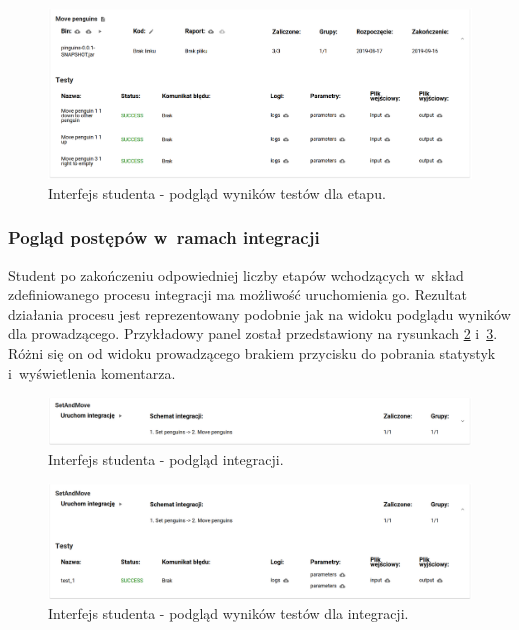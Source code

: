\begin{figure}[H]
    \centering
    \includegraphics[width = 16cm]{chapter04/student_stage_tests.png}
    \caption{Interfejs studenta - podgląd wyników testów dla etapu.}
    \label{fig:student_stage_tests}
\end{figure}

\subsubsection{Pogląd postępów w~ramach integracji}

Student po zakończeniu odpowiedniej liczby etapów wchodzących w~skład zdefiniowanego procesu integracji ma możliwość uruchomienia go.
Rezultat działania procesu jest reprezentowany podobnie jak na widoku podglądu wyników dla prowadzącego.
Przykładowy panel został przedstawiony na rysunkach \ref{fig:student_integration} i~\ref{fig:student_integration_tests}.
Różni się on od widoku prowadzącego brakiem przycisku do pobrania statystyk i~wyświetlenia komentarza.

\begin{figure}[H]
    \centering
    \includegraphics[width = 16cm]{chapter04/student_integration.png}
    \caption{Interfejs studenta - podgląd integracji.}
    \label{fig:student_integration}
\end{figure}

\begin{figure}[H]
    \centering
    \includegraphics[width = 16cm]{chapter04/student_integration_tests.png}
    \caption{Interfejs studenta - podgląd wyników testów dla integracji.}
    \label{fig:student_integration_tests}
\end{figure}

\vfill